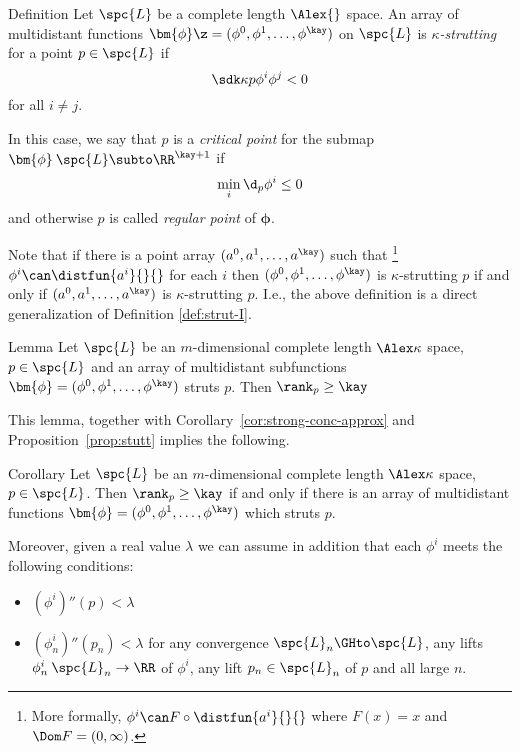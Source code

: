 \begin{thm}{Definition}\label{def:strut-II}
Let $\spc{L}$ be a complete length $\Alex{}$ space.
An array of multidistant functions 
$\bm{\phi}\z=(\phi^0,\phi^1,\dots,\phi^\kay)$
on $\spc{L}$
is \emph{$\kappa$-strutting} for a point $p\in\spc{L}$ if 
\[\sdk\kappa{p}{\phi^i}{\phi^j}<0\]
for all $i\not=j$.

In this case, we say that $p$ is a 
\emph{critical point} 
for the submap $\bm{\phi}\:\spc{L}\subto \RR^{\kay+1}$
if
\[\min_i\d_p\phi^i\le 0\]
and otherwise $p$ is called 
\emph{regular point} of $\bm{\phi}$.
\end{thm} 

Note that if there is a point array $(a^0,a^1,\dots,a^\kay)$
such that%
\footnote{More formally, $\phi^i\can F\circ\distfun{a^i}{}{}$ where $F(x)=x$ and $\Dom F=(0,\infty)$.} $\phi^i\can\distfun{a^i}{}{}$ for each $i$
then $(\phi^0,\phi^1,\dots,\phi^\kay)$
is $\kappa$-strutting $p$
if and only if 
$(a^0,a^1,\dots,a^\kay)$ is $\kappa$-strutting $p$.
I.e., the above definition is a direct generalization of Definition \ref{def:strut-I}.

\begin{thm}{Lemma}\label{lem:multi+rank}
Let $\spc{L}$ be an $m$-dimensional complete length $\Alex\kappa$ space, 
$p\in  \spc{L}$
and an array of multidistant subfunctions $\bm{\phi}=(\phi^0,\phi^1,\dots,\phi^\kay)$ struts $p$.
Then $\rank_p\ge \kay$
\end{thm}

This lemma, 
together with Corollary~\ref{cor:strong-conc-approx}
and Proposition~\ref{prop:stutt} implies the following.


\begin{thm}{Corollary}\label{cor:multi+rank}
Let $\spc{L}$ be an $m$-dimensional complete length $\Alex\kappa$ space, 
$p\in  \spc{L}$.
Then $\rank_p\ge \kay$
if and only if there is an array of multidistant functions $\bm{\phi}=(\phi^0,\phi^1,\dots,\phi^\kay)$ which struts $p$.

Moreover, given a real value $\lambda$
we can assume in addition that each $\phi^i$ meets the following conditions:
\begin{itemize}
\item $(\phi^i)''(p)< \lambda$
\item $(\phi_n^i)''(p_n)< \lambda$ for 
any convergence $\spc{L}_n\GHto\spc{L}$,
any lifts $\phi^i_n\:\spc{L}_n\to\RR$ of $\phi^i$,
any lift $p_n\in \spc{L}_n$ of $p$
and all large $n$.
\end{itemize}
\end{thm}

